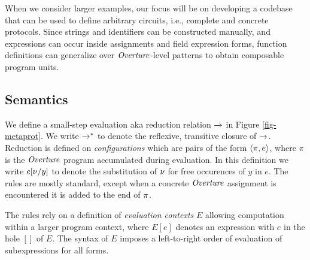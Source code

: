 When we consider larger examples, our
focus will be on developing a codebase that can be used to define
arbitrary circuits, i.e., complete and concrete protocols. Since
strings and identifiers can be constructed manually, and expressions
can occur inside assignments and field expression forms, function
definitions can generalize over $\mathit{Overture}$-level patterns to obtain
composable program units.
\subsection{Semantics}

We define a small-step evaluation aka reduction relation $\xrightarrow{}$ in
Figure \ref{fig-metaprot}.  We write $\xrightarrow{}^{*}$ to denote the
reflexive, transitive closure of $\xrightarrow{}$. Reduction is defined on
\emph{configurations} which are pairs of the form $\langle \pi,e \rangle$,
where $\pi$ is the $\mathit{Overture}$ program accumulated during evaluation.
In this definition we write $e[\nu/y]$ to denote the substitution of $\nu$
for free occurences of $y$ in $e$. The rules are mostly standard,
except when a concrete $\mathit{Overture}$ assignment is encountered it is added
to the end of $\pi$.

The rules rely on a definition of \emph{evaluation contexts} $E$
allowing computation within a larger program context, where $E[e]$
denotes an expression with $e$ in the hole $[]$ of $E$. The syntax
of $E$ imposes a left-to-right order of evaluation of subexpressions
for all forms.
